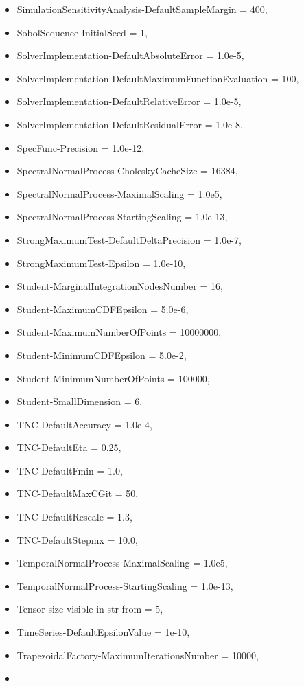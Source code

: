 \begin{itemize}
\item
  SimulationSensitivityAnalysis-DefaultSampleMargin = 400,
\item
  SobolSequence-InitialSeed = 1,
\item
  SolverImplementation-DefaultAbsoluteError = 1.0e-5,
\item
  SolverImplementation-DefaultMaximumFunctionEvaluation = 100,
\item
  SolverImplementation-DefaultRelativeError = 1.0e-5,
\item
  SolverImplementation-DefaultResidualError = 1.0e-8,
\item
  SpecFunc-Precision = 1.0e-12,
\item
  SpectralNormalProcess-CholeskyCacheSize = 16384,
\item
  SpectralNormalProcess-MaximalScaling = 1.0e5,
\item
  SpectralNormalProcess-StartingScaling = 1.0e-13,
\item
  StrongMaximumTest-DefaultDeltaPrecision = 1.0e-7,
\item
  StrongMaximumTest-Epsilon = 1.0e-10,
\item
  Student-MarginalIntegrationNodesNumber = 16,
\item
  Student-MaximumCDFEpsilon = 5.0e-6,
\item
  Student-MaximumNumberOfPoints = 10000000,
\item
  Student-MinimumCDFEpsilon = 5.0e-2,
\item
  Student-MinimumNumberOfPoints = 100000,
\item
  Student-SmallDimension = 6,
\item
  TNC-DefaultAccuracy = 1.0e-4,
\item
  TNC-DefaultEta = 0.25,
\item
  TNC-DefaultFmin = 1.0,
\item
  TNC-DefaultMaxCGit = 50,
\item
  TNC-DefaultRescale = 1.3,
\item
  TNC-DefaultStepmx = 10.0,
\item
  TemporalNormalProcess-MaximalScaling = 1.0e5,
\item
  TemporalNormalProcess-StartingScaling = 1.0e-13,
\item
  Tensor-size-visible-in-str-from = 5,
\item
  TimeSeries-DefaultEpsilonValue = 1e-10,
\item
  TrapezoidalFactory-MaximumIterationsNumber = 10000,
\item

\end{itemize}
